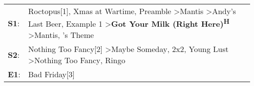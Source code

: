\begin{supertabular}{p{0.03\textwidth}p{0.92\textwidth}}
 \textbf{S1}:  &  Roctopus[1]\textsuperscript{}, \enspace Xmas at Wartime\textsuperscript{}, \enspace Preamble\textsuperscript{} \textgreater \enspace Mantis\textsuperscript{} \textgreater \enspace Andy's Last Beer\textsuperscript{}, \enspace Example 1\textsuperscript{} \textgreater \enspace \textbf{Got Your Milk (Right Here)\textsuperscript{H}} \textgreater \enspace Mantis\textsuperscript{}, 's Theme\textsuperscript{}  \enspace  \\
 \textbf{S2}:  &                                                                                                                                                                  Nothing Too Fancy[2]\textsuperscript{} \textgreater \enspace Maybe Someday\textsuperscript{}, \enspace 2x2\textsuperscript{}, \enspace Young Lust\textsuperscript{} \textgreater \enspace Nothing Too Fancy\textsuperscript{}, \enspace Ringo\textsuperscript{}  \enspace  \\
 \textbf{E1}:  &                                                                                                                                                                                                                                                                                                                                                                                                  Bad Friday[3]\textsuperscript{}  \enspace  \\
\end{supertabular}
